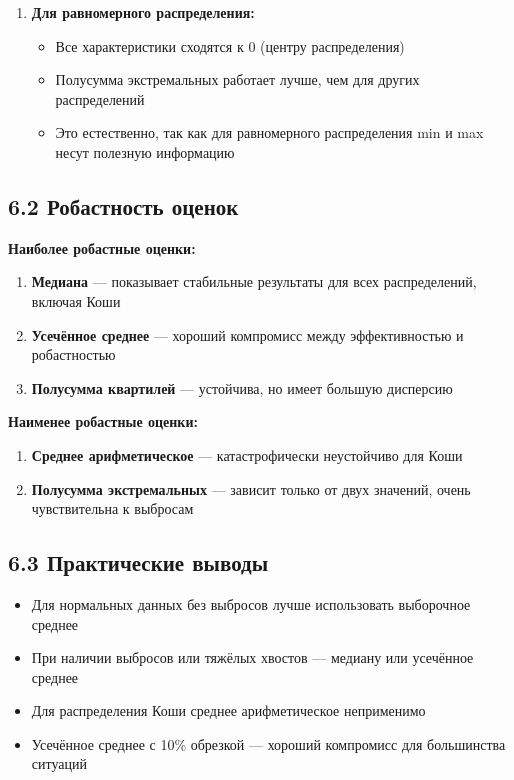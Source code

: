 \documentclass[a4paper,14pt]{extarticle}
\begin{document}
\begin{enumerate}
    \item \textbf{Для равномерного распределения:}
    \begin{itemize}
        \item Все характеристики сходятся к 0 (центру распределения)
        \item Полусумма экстремальных работает лучше, чем для других распределений
        \item Это естественно, так как для равномерного распределения min и max несут полезную информацию
    \end{itemize}
\end{enumerate}

\subsection*{6.2 Робастность оценок}

\textbf{Наиболее робастные оценки:}
\begin{enumerate}
    \item \textbf{Медиана} — показывает стабильные результаты для всех распределений, включая Коши
    \item \textbf{Усечённое среднее} — хороший компромисс между эффективностью и робастностью
    \item \textbf{Полусумма квартилей} — устойчива, но имеет большую дисперсию
\end{enumerate}

\textbf{Наименее робастные оценки:}
\begin{enumerate}
    \item \textbf{Среднее арифметическое} — катастрофически неустойчиво для Коши
    \item \textbf{Полусумма экстремальных} — зависит только от двух значений, очень чувствительна к выбросам
\end{enumerate}

\subsection*{6.3 Практические выводы}

\begin{itemize}
    \item Для нормальных данных без выбросов лучше использовать выборочное среднее
    \item При наличии выбросов или тяжёлых хвостов — медиану или усечённое среднее
    \item Для распределения Коши среднее арифметическое неприменимо
    \item Усечённое среднее с 10\% обрезкой — хороший компромисс для большинства ситуаций
\end{itemize}
\end{document}
